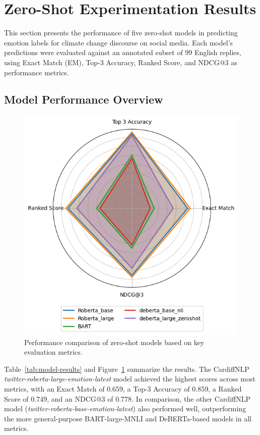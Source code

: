 \section{Zero-Shot Experimentation Results}

This section presents the performance of five zero-shot models in predicting emotion labels for climate change discourse on social media. Each model’s predictions were evaluated against an annotated subset of 99 English replies, using Exact Match (EM), Top-3 Accuracy, Ranked Score, and NDCG@3 as performance metrics.

\subsection{Model Performance Overview}
\begin{figure}[ht]
    \centering
    \includegraphics[width=0.5\linewidth, height=0.34\textheight]{images/model_comp1.png}
    \caption{Performance comparison of zero-shot models based on key evaluation metrics.}
    \label{fig:model-comp}
\end{figure}

Table~\ref{tab:model-results} and Figure~\ref{fig:model-comp} summarize the results. The CardiffNLP \emph{twitter-roberta-large-emotion-latest} model achieved the highest scores across most metrics, with an Exact Match of 0.659, a Top-3 Accuracy of 0.859, a Ranked Score of 0.749, and an NDCG@3 of 0.778. In comparison, the other CardiffNLP model (\emph{twitter-roberta-base-emotion-latest}) also performed well, outperforming the more general-purpose BART-large-MNLI and DeBERTa-based models in all metrics.
\newline


